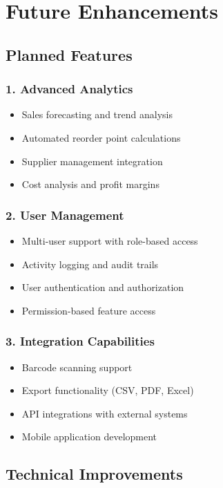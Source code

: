 \documentclass[12pt,a4paper]{article}
\begin{document}
\section{Future Enhancements}

\subsection{Planned Features}

\subsubsection{1. Advanced Analytics}
\begin{itemize}
    \item Sales forecasting and trend analysis
    \item Automated reorder point calculations
    \item Supplier management integration
    \item Cost analysis and profit margins
\end{itemize}

\subsubsection{2. User Management}
\begin{itemize}
    \item Multi-user support with role-based access
    \item Activity logging and audit trails
    \item User authentication and authorization
    \item Permission-based feature access
\end{itemize}

\subsubsection{3. Integration Capabilities}
\begin{itemize}
    \item Barcode scanning support
    \item Export functionality (CSV, PDF, Excel)
    \item API integrations with external systems
    \item Mobile application development
\end{itemize}

\subsection{Technical Improvements}
\end{document}

